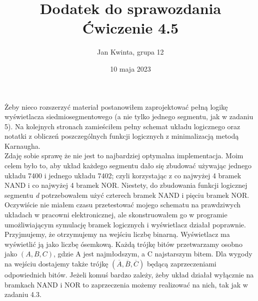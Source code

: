 \documentclass[14pt, table]{extarticle}
\title{\textbf{Dodatek do sprawozdania} \\ \Large{Ćwiczenie 4.5}}
\date{10 maja 2023}
\author{ \Large{Jan Kwinta, grupa 12}}
\begin{document}
\maketitle

Żeby nieco rozszerzyć materiał postanowiłem zaprojektować pełną logikę wyświetlacza siedmiosegmentowego (a nie tylko jednego segmentu, jak w zadaniu 5). Na kolejnych stronach zamieściłem pełny schemat układu logicznego oraz notatki z obliczeń poszczególnych funkcji logicznych z minimalizacją metodą Karnaugha. \\

Zdaję sobie sprawę że nie jest to najbardziej optymalna implementacja. Moim celem było to, aby układ każdego segmentu dało się zbudować używając jednego układu 7400 i jednego układu 7402; czyli korzystając z co najwyżej 4 bramek NAND i co najwyżej 4 bramek NOR. Niestety, do zbudowania funkcji logicznej segmentu \textit{d} potrzebowałem użyć czterech bramek NAND i pięciu bramek NOR. \\

Oczywiście nie miałem czasu przetestować mojego schematu na prawdziwych układach w pracowni elektronicznej, ale skonstruowałem go w programie umożliwiającym symulację bramek logicznych i wyświetlacz działał poprawnie. \\

Przyjmujemy, że otrzymujemy na wejściu liczbę binarną. Wyświetlacz ma wyświetlić ją jako liczbę ósemkową. Każdą trójkę bitów przetwarzamy osobno jako $(A, B, C)$, gdzie A jest najmłodszym, a C najstarszym bitem. Dla wygody na wejściu dostajemy także trójkę $(\overline{A}, \overline{B}, \overline{C})$ będącą zaprzeczeniami odpowiednich bitów. Jeżeli komuś bardzo zależy, żeby układ działał wyłącznie na bramkach NAND i NOR to zaprzeczenia możemy realizować na nich, tak jak w zadaniu 4.3.

\newpage
\end{document}
